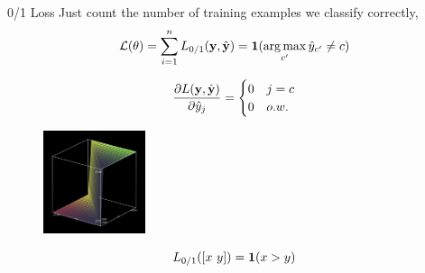 \documentclass{beamer}
\begin{document}
\begin{frame}{0/1 Loss}
  Just count the number of training examples we classify correctly,  
  \[{\mathcal{L}(\theta)} = \sum_{i=1}^n L_{0/1}(\boldy, \hat{\boldy}) = \indicator(\argmax_{c'} \hat{y}_{c'} \neq c)   \]

  \pause
\[ \frac{\partial L(\mathbf{y}, \hat{\mathbf{y}})}{\partial \hat{y}_j} = \begin{cases}0 & j = c\\ 0 & o.w. \end{cases}  \]

      \begin{figure}
        \centering
      \includegraphics[width=3cm]{argmax}
      \end{figure}
      \[L_{0/1}([x\ y]) = \mathbf{1}(x > y) \]      

\end{frame}


  





\end{document}

